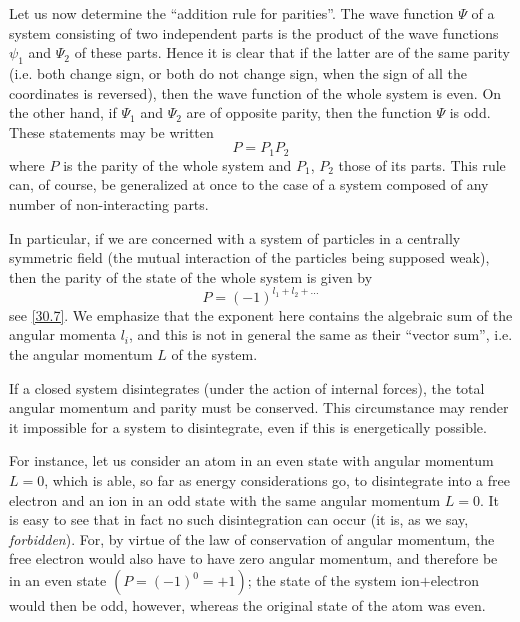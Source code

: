 Let us now determine the “addition rule for parities”. The wave function $\Psi$ of a system consisting of two independent parts is the product of the wave functions $\psi_1$ and $\Psi_2$ of these parts. Hence it is clear that if the latter are of the same parity (i.e. both change sign, or both do not change sign, when the sign of all the coordinates is reversed), then the wave function of the whole system is even. On the other hand, if $\Psi_1$ and $\Psi_2$ are of opposite parity, then the function $\Psi$ is odd. These statements may be written
\begin{equation}\label{31.5}
P=P_1P_2
\end{equation}
where $ P $ is the parity of the whole system and $ P_1 $, $ P_2 $ those of its parts. This rule can, of course, be generalized at once to the case of a system composed of any number of non-interacting parts.

In particular, if we are concerned with a system of particles in a centrally symmetric field (the mutual interaction of the particles being supposed weak), then the parity of the state of the whole system is given by
\begin{equation}\label{31.6}
P=(-1)^{l_1+l_2+\dots}
\end{equation}
see \eqref{30.7}. We emphasize that the exponent here contains the algebraic sum of the angular momenta $ l_i $, and this is not in general the same as their “vector sum”, i.e. the angular momentum $ L $ of the system.

If a closed system disintegrates (under the action of internal forces), the total angular momentum and parity must be conserved. This circumstance may render it impossible for a system to disintegrate, even if this is energetically possible.

For instance, let us consider an atom in an even state with angular momentum $ L = 0 $, which is able, so far as energy considerations go, to disintegrate into a free electron and an ion in an odd state with the same angular momentum $ L = 0 $. It is easy to see that in fact no such disintegration can occur (it is, as we say, \textit{forbidden}). For, by virtue of the law of conservation of angular momentum, the free electron would also have to have zero angular momentum, and therefore be in an even state $ (P = (−1)^0 = + 1) $; the state of the system ion$ + $electron would then be odd, however, whereas the original state of the atom was even.
